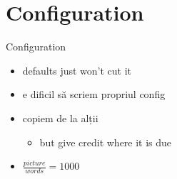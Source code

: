 \documentclass{beamer}
\begin{document}
\section{Configuration}
\begin{frame}{Configuration}
  \begin{itemize}
    \item defaults just won't cut it
    \item e dificil să scriem propriul config
    \item copiem de la alții
    \pause
    \begin{itemize}
      \item but give credit where it is due
    \end{itemize}
    \pause
    \item $ \frac{picture}{words} = 1000 $
  \end{itemize}
\end{frame}
\end{document}
